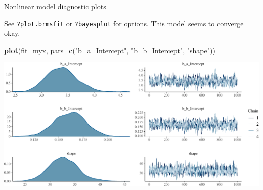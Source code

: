 \documentclass[
  ignorenonframetext,
]{beamer}
\newenvironment{Shaded}{\begin{snugshade}}{\end{snugshade}}
\newcommand{\DataTypeTok}[1]{\textcolor[rgb]{0.13,0.29,0.53}{#1}}
\newcommand{\KeywordTok}[1]{\textcolor[rgb]{0.13,0.29,0.53}{\textbf{#1}}}
\newcommand{\NormalTok}[1]{#1}
\newcommand{\StringTok}[1]{\textcolor[rgb]{0.31,0.60,0.02}{#1}}
\begin{document}
\begin{frame}[fragile]{Nonlinear model diagnostic plots}
\protect\hypertarget{nonlinear-model-diagnostic-plots}{}

See \texttt{?plot.brmsfit} or \texttt{?bayesplot} for options. This
model seems to converge okay.

\scriptsize

\begin{Shaded}
\begin{Highlighting}[]
\KeywordTok{plot}\NormalTok{(fit_myx, }\DataTypeTok{pars=}\KeywordTok{c}\NormalTok{(}\StringTok{"b_a_Intercept"}\NormalTok{, }\StringTok{"b_b_Intercept"}\NormalTok{, }\StringTok{"shape"}\NormalTok{))}
\end{Highlighting}
\end{Shaded}

\includegraphics{intro_Bayes_files/figure-beamer/unnamed-chunk-19-1.pdf}

\end{frame}
\end{document}
